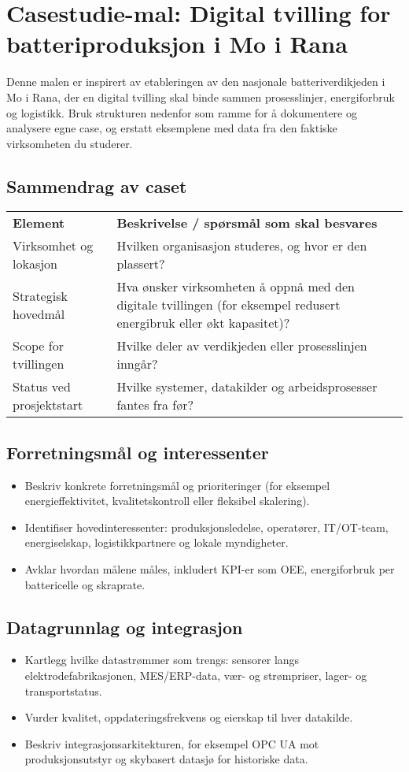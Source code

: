 \section{Casestudie-mal: Digital tvilling for batteriproduksjon i Mo i Rana}
Denne malen er inspirert av etableringen av den nasjonale batteriverdikjeden i Mo i Rana, der en digital tvilling skal binde sammen prosesslinjer, energiforbruk og logistikk. Bruk strukturen nedenfor som ramme for å dokumentere og analysere egne case, og erstatt eksemplene med data fra den faktiske virksomheten du studerer.

\subsection{Sammendrag av caset}
\begin{tabular}{p{}p{}}
\textbf{Element} & \textbf{Beskrivelse / spørsmål som skal besvares} \\
Virksomhet og lokasjon & Hvilken organisasjon studeres, og hvor er den plassert? \\
Strategisk hovedmål & Hva ønsker virksomheten å oppnå med den digitale tvillingen (for eksempel redusert energibruk eller økt kapasitet)? \\
Scope for tvillingen & Hvilke deler av verdikjeden eller prosesslinjen inngår? \\
Status ved prosjektstart & Hvilke systemer, datakilder og arbeidsprosesser fantes fra før? \\
\end{tabular}

\subsection{Forretningsmål og interessenter}
\begin{itemize}
    \item Beskriv konkrete forretningsmål og prioriteringer (for eksempel energieffektivitet, kvalitetskontroll eller fleksibel skalering).
    \item Identifiser hovedinteressenter: produksjonsledelse, operatører, IT/OT-team, energiselskap, logistikkpartnere og lokale myndigheter.
    \item Avklar hvordan målene måles, inkludert KPI-er som OEE, energiforbruk per battericelle og skraprate.
\end{itemize}

\subsection{Datagrunnlag og integrasjon}
\begin{itemize}
    \item Kartlegg hvilke datastrømmer som trengs: sensorer langs elektrodefabrikasjonen, MES/ERP-data, vær- og strømpriser, lager- og transportstatus.
    \item Vurder kvalitet, oppdateringsfrekvens og eierskap til hver datakilde.
    \item Beskriv integrasjonsarkitekturen, for eksempel OPC UA mot produksjonsutstyr og skybasert datasjø for historiske data.
\end{itemize}

